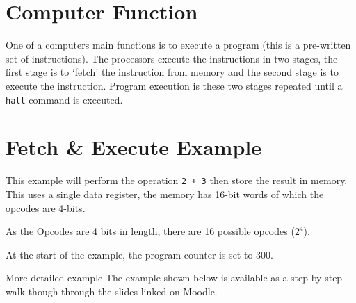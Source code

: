 
\section*{Computer Function}
One of a computers main functions is to execute a program (this is a pre-written set of instructions). The processors execute the instructions in two stages, the first stage is to `fetch' the instruction from memory and the second stage is to execute the instruction. Program execution is these two stages repeated until a \verb|halt| command is executed.

\section*{Fetch \& Execute Example}
This example will perform the operation \verb|2 + 3| then store the result in memory. This uses a single data register, the memory has 16-bit words of which the opcodes are 4-bits. 

As the Opcodes are 4 bits in length, there are 16 possible opcodes ($2^4$).

At the start of the example, the program counter is set to 300. 
\begin{link}{More detailed example}
The example shown below is available as a step-by-step walk though through the slides linked on Moodle.
\end{link}
